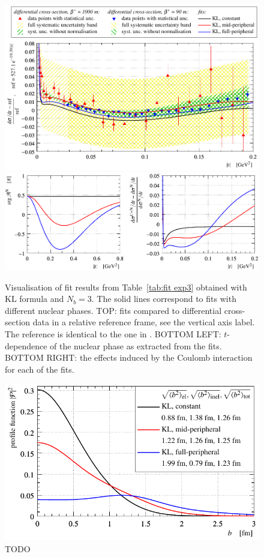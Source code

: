 \begin{figure}
\begin{center}
\includegraphics{fig/fit_exp3/t_dist_rel_with_fit.pdf}
\includegraphics{fig/fit_exp3/phase_cni_effect.pdf}
\caption{Visualisation of fit results from Table~\ref{tab:fit exp3} obtained with KL formula and $N_b=3$. The solid lines correspond to fits with different nuclear phases.
TOP: fits compared to differential cross-section data in a relative reference frame, see the vertical axis label. The reference is identical to the one in \cite{8tev-90m}. 
BOTTOM LEFT: $t$-dependence of the nuclear phase as extracted from the fits.
BOTTOM RIGHT: the effects induced by the Coulomb interaction for each of the fits.
}%
\label{fig:fit exp3}
\end{center}
\end{figure}

\begin{figure}
\begin{center}
\includegraphics{fig/fit_exp3/b_dist.pdf}
\caption{TODO
}%
\label{fig:bdist exp3}
\end{center}
\end{figure}


